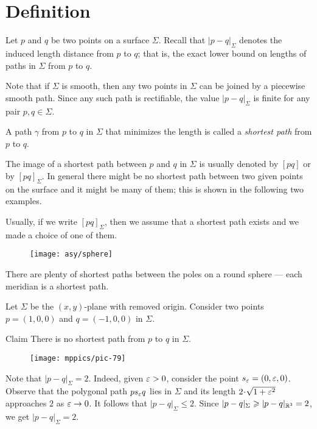 \section{Definition}

Let $p$ and $q$ be two points on a surface $\Sigma$.
Recall that $|p-q|_\Sigma$ denotes the induced length distance from $p$ to $q$;
that is, the exact lower bound on lengths of paths in $\Sigma$ from $p$ to $q$.

Note that if $\Sigma$ is smooth, then any two points in $\Sigma$ can be joined by a piecewise smooth path.
Since any such path is rectifiable, the value $|p-q|_\Sigma$ is finite for any pair $p,q\in\Sigma$.

A path $\gamma$ from $p$ to $q$ in $\Sigma$ that minimizes the length is called a \emph{shortest path} from $p$ to $q$.

The image of a shortest path between $p$ and $q$ in $\Sigma$ is usually denoted by $[pq]$ or by $[pq]_\Sigma$.
In general there might be no shortest path between two given points on the surface
and it might be many of them;
this is shown in the following two examples.

Usually, if we write $[pq]_\Sigma$, then we assume that a shortest path exists and we made a choice of one of them.

{

\begin{wrapfigure}{r}{28 mm}
\vskip-6mm
\centering
\texttt{[image: asy/sphere]}
\end{wrapfigure}

 There are plenty of shortest paths between the poles on a round sphere --- each meridian is a shortest path.

 Let $\Sigma$ be the $(x,y)$-plane with removed origin.
Consider two points $p=(1,0,0)$ and $q=(-1,0,0)$ in $\Sigma$.

}

\begin{thm}{Claim}
There is no shortest path from $p$ to $q$ in $\Sigma$.
\end{thm}

\begin{wrapfigure}{r}{28 mm}
\vskip-4mm
\centering
\texttt{[image: mppics/pic-79]}
\end{wrapfigure}

Note that $|p-q|_\Sigma=2$. 
Indeed, given $\eps\z>0$, consider the point $s_\varepsilon=(0,\varepsilon,0)$.
Observe that the polygonal path $ps_\varepsilon q$ lies in $\Sigma$ and its length $2\cdot\sqrt{1+\eps^2}$ approaches $2$ as $\varepsilon\to0$.
It follows that $|p-q|_\Sigma\le 2$.
Since $|p-q|_\Sigma\geqslant |p-q|_{\mathbb{R}^3}=2$, we get $|p-q|_\Sigma=2$.


